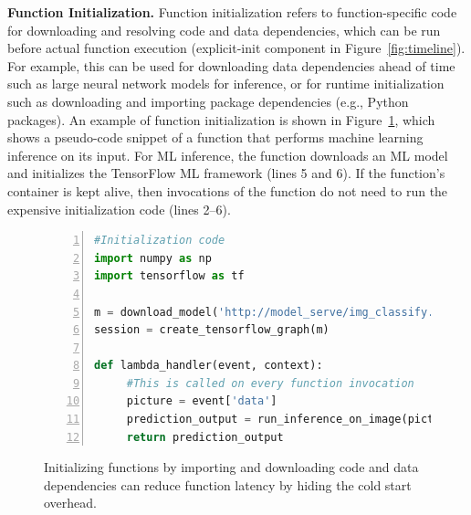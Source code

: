\noindent \textbf{Function Initialization.}
%
Function initialization refers to function-specific code for downloading and resolving code and data dependencies, which can be run before actual function execution (explicit-init component in Figure~\ref{fig:timeline}). 
For example, this can be used for downloading data dependencies ahead of time such as large neural network models for inference, or for runtime initialization such as downloading and importing package dependencies (e.g., Python packages). 
%
An example of function initialization is shown in Figure~\ref{fig:lambda-example}, which shows a pseudo-code snippet of a function that performs machine learning inference on its input. 
For ML inference, the function downloads an ML model and initializes the TensorFlow ML framework (lines  5 and 6). 
If the function's container is kept alive, then invocations of the function do not need to run the expensive initialization code (lines 2--6). 


\begin{figure}
\begin{lstlisting}[language=Python, numbers=left, frame=single, basicstyle=\footnotesize\sffamily, columns=fullflexible, xleftmargin=10.0ex, xrightmargin=10.0ex]
#Initialization code 
import numpy as np 
import tensorflow as tf
  
m = download_model('http://model_serve/img_classify.pb')
session = create_tensorflow_graph(m) 
  
def lambda_handler(event, context):
     #This is called on every function invocation 
     picture = event['data']
     prediction_output = run_inference_on_image(picture) 
     return prediction_output 
   \end{lstlisting}
   \caption{Initializing functions by importing and downloading code and data dependencies can reduce function latency by hiding the cold start overhead.}
   \label{fig:lambda-example}
\end{figure}


